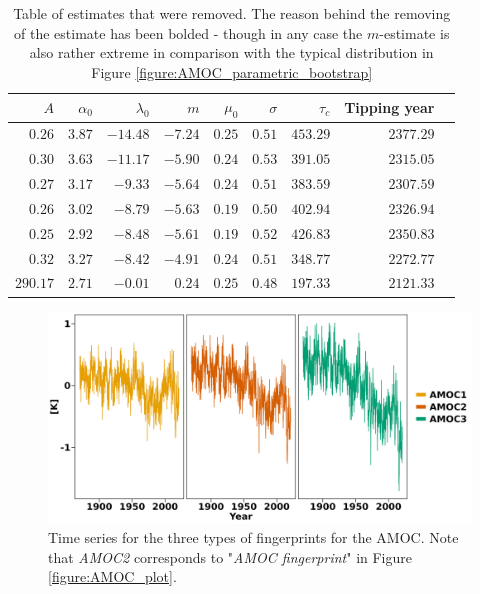     \begin{table}[ht]
        \centering
        \begin{tabular}{rrrrrrrrr}
            \hline
            $A$ & $\alpha_0$ & $\lambda_0$ & $m$ & $\mu_0$ & $\sigma$ & $\tau_c$ & Tipping year \\ 
            \hline
            $0.26$ & $3.87$ & $\mathbf{-14.48}$ & $-7.24$ & $0.25$ & $0.51$ & $453.29$ & $2377.29$ \\ 
            $0.30$ & $3.63$ & $\mathbf{-11.17}$ & $-5.90$ & $0.24$ & $0.53$ & $391.05$ & $2315.05$ \\ 
            $0.27$ & $3.17$ & $\mathbf{-9.33}$ & $-5.64$ & $0.24$ & $0.51$ & $383.59$ & $2307.59$ \\ 
            $0.26$ & $3.02$ & $\mathbf{-8.79}$ & $-5.63$ & $0.19$ & $0.50$ & $402.94$ & $2326.94$ \\ 
            $0.25$ & $2.92$ & $\mathbf{-8.48}$ & $-5.61$ & $0.19$ & $0.52$ & $426.83$ & $2350.83$ \\ 
            $0.32$ & $3.27$ & $\mathbf{-8.42}$ & $-4.91$ & $0.24$ & $0.51$ & $348.77$ & $2272.77$ \\ 
            $\mathbf{290.17}$ & $2.71$ & $-0.01$ & $0.24$& $0.25$ & $0.48$ & $197.33$ & $2121.33$ \\ 
             \hline
        \end{tabular}
        \caption{Table of estimates that were removed. The reason behind the removing of the estimate has been bolded - though in any case the $m$-estimate is also rather extreme in comparison with the typical distribution in Figure \ref{figure:AMOC_parametric_bootstrap}}
        \label{table:extreme_amoc_estimates}
    \end{table}
    \begin{figure}[h!]
        \begin{center}
            \includegraphics[scale = .1]{figures/AMOC_alt_plot.jpeg}
            \caption{Time series for the three types of fingerprints for the AMOC. Note that \textit{AMOC2} corresponds to "\textit{AMOC fingerprint}" in Figure \ref{figure:AMOC_plot}.}
            \label{figure:allAMOCFingerprints}
        \end{center}
    \end{figure}
\newpage

